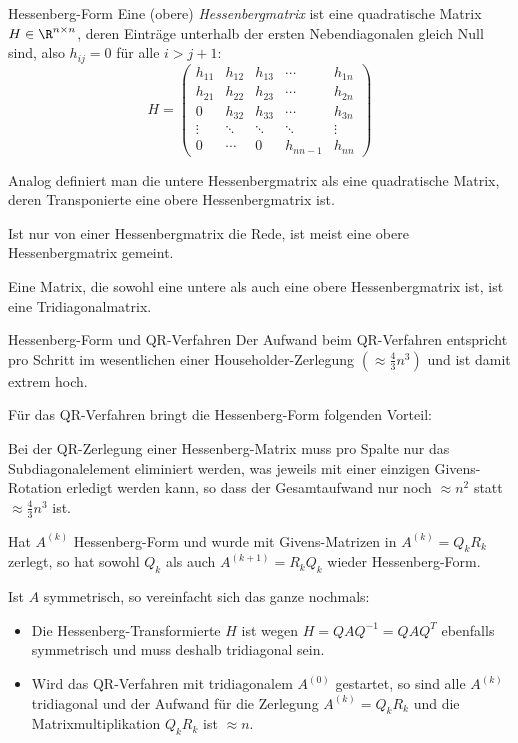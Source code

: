 \begin{defi}{Hessenberg-Form}
    Eine (obere) \emph{Hessenbergmatrix} ist eine quadratische Matrix $H \in \R^{n \times n}$, deren Einträge unterhalb der ersten Nebendiagonalen gleich Null sind, also $h_{ij} = 0$ für alle $i > j + 1$:
    \[
        H =
        \begin{pmatrix}
            h_{11} & h_{12} & h_{13} & \cdots   & h_{1n} \\
            h_{21} & h_{22} & h_{23} & \cdots   & h_{2n} \\
            0      & h_{32} & h_{33} & \cdots   & h_{3n} \\
            \vdots & \ddots & \ddots & \ddots   & \vdots \\
            0      & \cdots & 0      & h_{nn-1} & h_{nn}
        \end{pmatrix}
    \]

    Analog definiert man die untere Hessenbergmatrix als eine quadratische Matrix, deren Transponierte eine obere Hessenbergmatrix ist.

    Ist nur von einer Hessenbergmatrix die Rede, ist meist eine obere Hessenbergmatrix gemeint.

    Eine Matrix, die sowohl eine untere als auch eine obere Hessenbergmatrix ist, ist eine Tridiagonalmatrix.
\end{defi}

\begin{bonus}{Hessenberg-Form und QR-Verfahren}
    Der Aufwand beim QR-Verfahren entspricht pro Schritt im wesentlichen einer Householder-Zerlegung $(\approx \frac{4}{3} n^3)$ und ist damit extrem hoch.

    Für das QR-Verfahren bringt die Hessenberg-Form folgenden Vorteil:

    Bei der QR-Zerlegung einer Hessenberg-Matrix muss pro Spalte nur das Subdiagonalelement eliminiert werden, was jeweils mit einer einzigen Givens-Rotation erledigt werden kann, so dass der Gesamtaufwand nur noch $\approx n^2$ statt $\approx \frac{4}{3} n^3$ ist.

    Hat $A^{(k)}$ Hessenberg-Form und wurde mit Givens-Matrizen in $A^{(k)} = Q_k R_k$ zerlegt, so hat sowohl $Q_k$ als auch $A^{(k+1)} = R_k Q_k$ wieder Hessenberg-Form.

    Ist $A$ symmetrisch, so vereinfacht sich das ganze nochmals:
    \begin{itemize}
        \item Die Hessenberg-Transformierte $H$ ist wegen $H = QAQ^{-1} = QAQ^T$ ebenfalls symmetrisch und muss deshalb tridiagonal sein.
        \item Wird das QR-Verfahren mit tridiagonalem $A^{(0)}$ gestartet, so sind alle $A^{(k)}$ tridiagonal und der Aufwand für die Zerlegung $A^{(k)} = Q_k R_k$ und die Matrixmultiplikation $Q_k R_k$ ist $\approx n$.
    \end{itemize}
\end{bonus}

